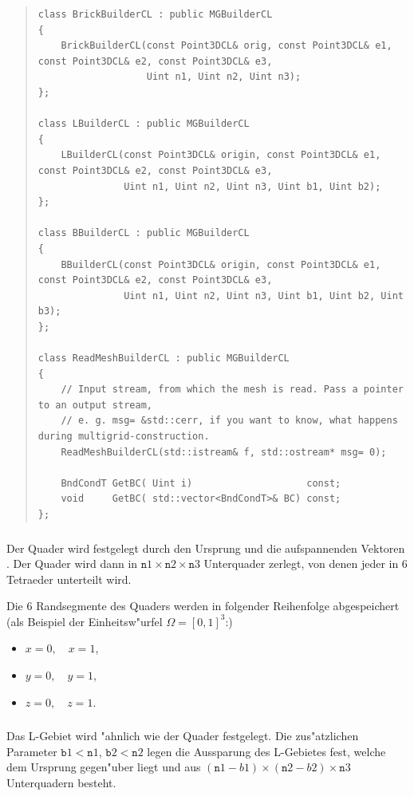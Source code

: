 \documentclass[11pt,a4paper]{article}
\newenvironment{Code}{\begin{quote}\scriptsize}{\end{quote}}
\begin{document}
\begin{Code}
\begin{verbatim}
class BrickBuilderCL : public MGBuilderCL
{
    BrickBuilderCL(const Point3DCL& orig, const Point3DCL& e1, const Point3DCL& e2, const Point3DCL& e3, 
                   Uint n1, Uint n2, Uint n3);
};

class LBuilderCL : public MGBuilderCL
{
    LBuilderCL(const Point3DCL& origin, const Point3DCL& e1, const Point3DCL& e2, const Point3DCL& e3,
               Uint n1, Uint n2, Uint n3, Uint b1, Uint b2);
};

class BBuilderCL : public MGBuilderCL
{
    BBuilderCL(const Point3DCL& origin, const Point3DCL& e1, const Point3DCL& e2, const Point3DCL& e3,
               Uint n1, Uint n2, Uint n3, Uint b1, Uint b2, Uint b3);
};

class ReadMeshBuilderCL : public MGBuilderCL
{
    // Input stream, from which the mesh is read. Pass a pointer to an output stream,
    // e. g. msg= &std::cerr, if you want to know, what happens during multigrid-construction.
    ReadMeshBuilderCL(std::istream& f, std::ostream* msg= 0);

    BndCondT GetBC( Uint i)                    const;
    void     GetBC( std::vector<BndCondT>& BC) const;
};
\end{verbatim}
\end{Code}

\subsubsection{}
Der Quader wird festgelegt durch den Ursprung 
und die aufspannenden Vektoren . Der Quader wird dann in
${\mathtt n1}\times{\mathtt n2}\times{\mathtt n3}$ Unterquader zerlegt, von
denen jeder in 6 Tetraeder unterteilt wird.

Die 6 Randsegmente des Quaders werden in folgender Reihenfolge abgespeichert
(als Beispiel der Einheitsw"urfel $\Omega=[0,1]^3$:) 
\begin{itemize}
    \item $x=0, \quad x=1$, 
    \item $y=0, \quad y=1$, 
    \item $z=0, \quad z=1$.
\end{itemize}

\subsubsection{}  Das L-Gebiet wird "ahnlich wie der Quader
festgelegt. Die zus"atzlichen Parameter ${\mathtt b1}<{\mathtt n1}$, ${\mathtt
b2}<{\mathtt n2}$ legen die Aussparung des L-Gebietes fest, welche dem
Ursprung gegen"uber liegt und aus $({\mathtt n1-b1})\times({\mathtt
n2-b2})\times{\mathtt n3}$ Unterquadern besteht.
\end{document}
